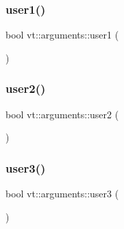 \subsubsection{\texorpdfstring{user1()}{user1()}}
{\footnotesize\ttfamily bool vt\+::arguments\+::user1 (\begin{DoxyParamCaption}{ }\end{DoxyParamCaption})\hspace{0.3cm}{\ttfamily [inline]}}

\mbox{\label{namespacevt_1_1arguments_ae58fe1d056c863f7d8103e9c240d17f2}} 
\subsubsection{\texorpdfstring{user2()}{user2()}}
{\footnotesize\ttfamily bool vt\+::arguments\+::user2 (\begin{DoxyParamCaption}{ }\end{DoxyParamCaption})\hspace{0.3cm}{\ttfamily [inline]}}

\mbox{\label{namespacevt_1_1arguments_afedf2c9949568b862ec5f8274ef6846b}} 
\subsubsection{\texorpdfstring{user3()}{user3()}}
{\footnotesize\ttfamily bool vt\+::arguments\+::user3 (\begin{DoxyParamCaption}{ }\end{DoxyParamCaption})\hspace{0.3cm}{\ttfamily [inline]}}

